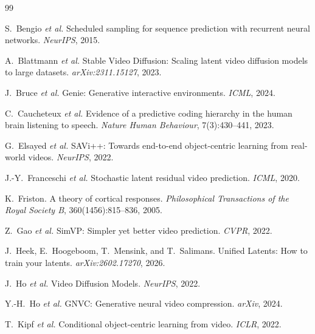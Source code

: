 \documentclass{article}
\begin{document}

\begin{thebibliography}{99}

S.~Bengio \textit{et al.}
\newblock Scheduled sampling for sequence prediction with recurrent neural networks.
\newblock \textit{NeurIPS}, 2015.

A.~Blattmann \textit{et al.}
\newblock Stable Video Diffusion: Scaling latent video diffusion models to large datasets.
\newblock \textit{arXiv:2311.15127}, 2023.

J.~Bruce \textit{et al.}
\newblock Genie: Generative interactive environments.
\newblock \textit{ICML}, 2024.

C.~Caucheteux \textit{et al.}
\newblock Evidence of a predictive coding hierarchy in the human brain listening to speech.
\newblock \textit{Nature Human Behaviour}, 7(3):430--441, 2023.

G.~Elsayed \textit{et al.}
\newblock SAVi++: Towards end-to-end object-centric learning from real-world videos.
\newblock \textit{NeurIPS}, 2022.

J.-Y.~Franceschi \textit{et al.}
\newblock Stochastic latent residual video prediction.
\newblock \textit{ICML}, 2020.

K.~Friston.
\newblock A theory of cortical responses.
\newblock \textit{Philosophical Transactions of the Royal Society B}, 360(1456):815--836, 2005.

Z.~Gao \textit{et al.}
\newblock SimVP: Simpler yet better video prediction.
\newblock \textit{CVPR}, 2022.

J.~Heek, E.~Hoogeboom, T.~Mensink, and T.~Salimans.
\newblock Unified Latents: How to train your latents.
\newblock \textit{arXiv:2602.17270}, 2026.

J.~Ho \textit{et al.}
\newblock Video Diffusion Models.
\newblock \textit{NeurIPS}, 2022.

Y.-H.~Ho \textit{et al.}
\newblock GNVC: Generative neural video compression.
\newblock \textit{arXiv}, 2024.

T.~Kipf \textit{et al.}
\newblock Conditional object-centric learning from video.
\newblock \textit{ICLR}, 2022.


\end{thebibliography}
\end{document}
